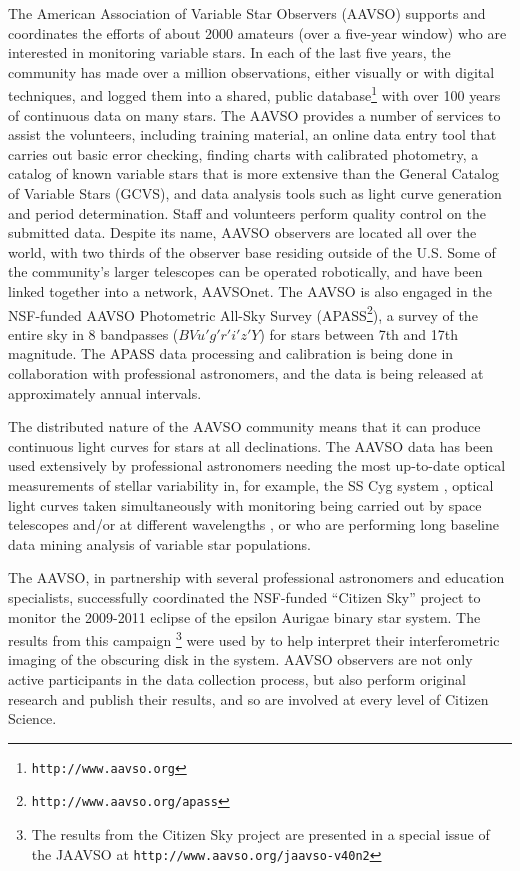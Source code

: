 \documentclass{ar2e}
\def\eg{{\it e.g.}\xspace}
\def\CaseStudy#1{\noindent{\it\bf #1 \,\,\,\,}}
\def\url#1{\texttt{#1}}
\begin{document}

\CaseStudy{Variable Star Monitoring: the AAVSO.}
The American Association of Variable Star Observers (AAVSO) supports and
coordinates the efforts of about 2000 amateurs (over a five-year window) who
are interested in monitoring variable stars.  In each of the last five years,
the community has made over a million observations, either visually or with
digital techniques, and logged them into a shared, public
database\footnote{\url{http://www.aavso.org}} with over 100 years of
continuous data on many stars.  The AAVSO provides a number of services to
assist the volunteers, including training material, an online data entry tool
that carries out basic error checking, finding charts with calibrated
photometry, a catalog of known variable stars that is more extensive than the
General Catalog of Variable Stars (GCVS), and data analysis tools such as
light curve generation and period determination.  Staff and volunteers perform
quality control on the submitted data.  Despite its name, AAVSO observers are
located all over the world, with two thirds of the observer base residing
outside of the U.S.  Some of the community's larger telescopes can be operated
robotically, and have been linked together into a network, AAVSOnet.  The
AAVSO is also engaged in the NSF-funded AAVSO Photometric All-Sky Survey
(APASS\footnote{\url{http://www.aavso.org/apass}}), a survey of the entire sky
in 8 bandpasses ($BVu'g'r'i'z'Y$) for stars between 7th and 17th magnitude. 
The APASS data processing and calibration is being done in collaboration with
professional astronomers, and the data is being released at approximately
annual intervals.

The distributed nature of the AAVSO community means that it can produce
continuous light curves for stars at all declinations.  The AAVSO data has
been used extensively by professional astronomers needing the most up-to-date
optical measurements of stellar variability in, for example, the SS Cyg system
\citep{Miller-Jones++2013}, optical light curves taken simultaneously with
monitoring being carried out by space telescopes and/or at different
wavelengths \citep[see \eg][for a successful joint AAVSO--HST
program]{Szkody++2013}, or who are performing long baseline data mining
analysis of variable star populations.

The AAVSO, in partnership with several professional astronomers and education
specialists, successfully coordinated the NSF-funded ``Citizen Sky'' project
to monitor the 2009-2011 eclipse of the epsilon Aurigae binary star system. 
The results from this campaign \citep{Stencel2012}\footnote{The results from
the Citizen Sky project are presented in a special issue of the JAAVSO at 
\url{http://www.aavso.org/jaavso-v40n2}} were used by 
\citet{Kloppenborg++2010} to help interpret their interferometric imaging of
the obscuring disk in the system.  AAVSO observers are not only active
participants in the data collection process, but also perform original
research and publish their results, and so are involved at every level of
Citizen Science.
\end{document}
